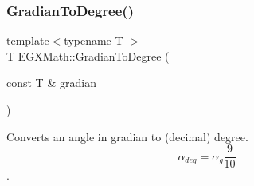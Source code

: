 \mbox{\label{group___e_g_x_math-_conversions-_angle_conversions-_gradian_gaa284952274f16d225951cf5139d0ff4e}} 
\subsubsection{\texorpdfstring{Gradian\+To\+Degree()}{GradianToDegree()}}
{\footnotesize\ttfamily template$<$typename T $>$ \\
T E\+G\+X\+Math\+::\+Gradian\+To\+Degree (\begin{DoxyParamCaption}\item[{const T \&}]{gradian }\end{DoxyParamCaption})}



Converts an angle in gradian to (decimal) degree. \[\alpha_{deg}=\alpha_{g}\frac{9}{10}\]. 

